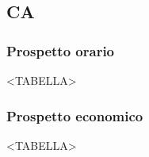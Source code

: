 \subsection{CA}

\subsubsection{Prospetto orario}

<TABELLA>

\subsubsection{Prospetto economico}

<TABELLA>

